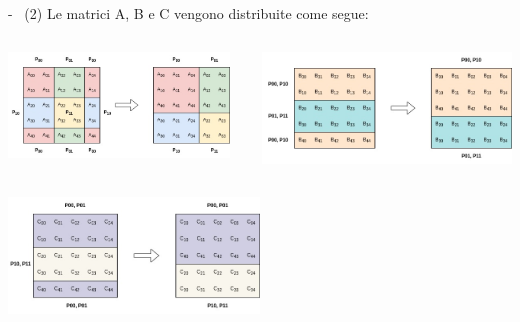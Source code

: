 \documentclass[compress]{beamer}
\begin{document}
\begin{frame}{\secname \text{ }- \subsecname\ (2)}
Le matrici A, B e C vengono distribuite come segue:
\begin{columns}
        \begin{minipage}[b]{1\textwidth}
            \begin{adjustbox}{margin=0cm 0cm 0.5cm 0cm, center} %
                \includegraphics[width=0.95\textwidth]{resources/matrixA_2d_block_cyclic_distribution.jpg}
            \end{adjustbox}
        \end{minipage}
            \begin{minipage}{1\textwidth}
                \begin{adjustbox}{margin=0cm 0cm 0.5cm 0cm, center} %
                    \includegraphics[width=1\textwidth]{resources/matrixB_row_block_cyclic_distribution.jpg}
                \end{adjustbox}
            \end{minipage}
    \end{columns}
    \begin{adjustbox}{margin=0cm 0cm 0.5cm 0.3cm, center} %
        \includegraphics[width=0.5\textwidth]{resources/matrixC_row_block_cyclic_distribution.jpg}
    \end{adjustbox}
\end{frame}
\end{document}

